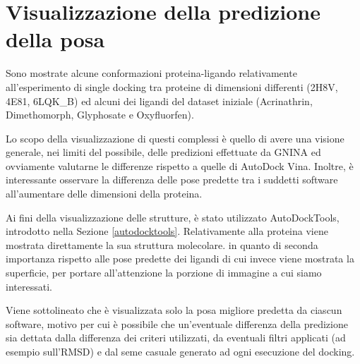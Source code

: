 \section{Visualizzazione della predizione della posa}

Sono mostrate alcune conformazioni proteina-ligando relativamente all'esperimento di single docking tra proteine di dimensioni differenti (2H8V, 4E81, 6LQK\_B) ed alcuni dei ligandi del dataset iniziale (Acrinathrin, Dimethomorph, Glyphosate e Oxyfluorfen).

Lo scopo della visualizzazione di questi complessi è quello di avere una visione generale, nei limiti del possibile, delle predizioni effettuate da GNINA ed ovviamente valutarne le differenze rispetto a quelle di AutoDock Vina. Inoltre, è interessante osservare la differenza delle pose predette tra i suddetti software all'aumentare delle dimensioni della proteina.

Ai fini della visualizzazione delle strutture, è stato utilizzato AutoDockTools, introdotto nella Sezione \ref{autodocktools}.
Relativamente alla proteina viene mostrata direttamente la sua struttura molecolare. in quanto di seconda importanza rispetto alle pose predette dei ligandi di cui invece viene mostrata la superficie, per portare all'attenzione la porzione di immagine a cui siamo interessati.

Viene sottolineato che è visualizzata solo la posa migliore predetta da ciascun software, motivo per cui è possibile che un'eventuale differenza della predizione sia dettata dalla differenza dei criteri utilizzati, da eventuali filtri applicati (ad esempio sull'RMSD) e dal seme casuale generato ad ogni esecuzione del docking.

